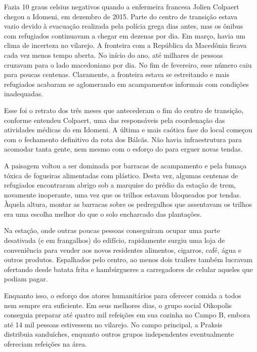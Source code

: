  

Fazia 10 graus celsius negativos quando a enfermeira francesa Jolien
Colpaert chegou a Idomeni, em dezembro de 2015. Parte do centro de
transição estava vazio devido à evacuação realizada pela polícia grega
dias antes, mas os ônibus com refugiados continuavam a chegar em dezenas
por dia. Em março, havia um clima de incerteza no vilarejo. 
A fronteira com a República da Macedônia ficava cada vez menos
tempo aberta. No início do ano, até milhares de pessoas cruzavam para o
lado macedoniano por dia. No fim de fevereiro, esse número caiu para
poucas centenas. Claramente, a fronteira estava se estreitando e mais
refugiados acabaram se aglomerando em acampamentos informais com
condições inadequadas.

Esse foi o retrato dos três meses que antecederam o fim do centro de
transição, conforme entendeu Colpaert, uma das responsáveis pela coordenação das
atividades médicas do  em Idomeni. A última e mais
caótica fase do local começou com o fechamento definitivo da rota
dos Bálcãs. Não havia infraestrutura para acomodar tanta gente, nem
mesmo com o esforço do  para erguer novas tendas.

A paisagem voltou a ser dominada por barracas de acampamento e pela
fumaça tóxica de fogueiras alimentadas com plástico. Desta
vez, algumas centenas de refugiados encontraram abrigo sob a marquise do
prédio da estação de trem, novamente inoperante, uma vez que os trilhos
estavam bloqueados por tendas. Àquela altura, montar as barracas sobre os pedregulhos que assentavam os trilhos era uma escolha melhor do que o solo encharcado das plantações. 
% 
% 
% 
%
%


Na estação, onde outras poucas pessoas conseguiram ocupar uma parte
desativada (e em frangalhos) do edifício, rapidamente surgiu uma loja de
conveniência para vender aos novos residentes alimentos, cigarros, café,
água e outros produtos. Espalhados pelo centro, ao menos dois
trailers também lucravam ofertando desde batata frita e hambúrgueres a
carregadores de celular aqueles que podiam pagar.

Enquanto isso, o esforço dos atores humanitários para oferecer comida a todos
nem sempre era suficiente. Em seus melhores dias, o grupo social
Oikopolis conseguia preparar até quatro mil refeições em sua cozinha no
Campo B, embora até 14 mil pessoas estivessem no vilarejo. No campo
principal, a  Praksis distribuia sanduíches, enquanto outros grupos
independentes eventualmente ofereciam refeições na área.

